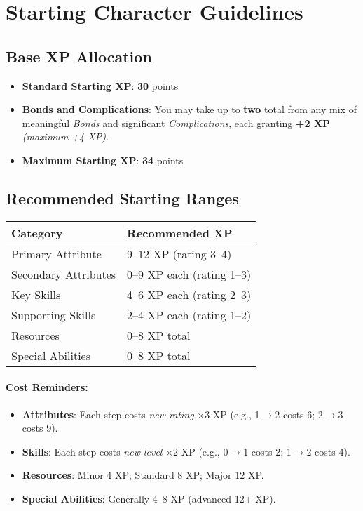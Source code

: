 \section{Starting Character Guidelines}
\label{ch:xp-paths:starting}

\subsection*{Base XP Allocation}
\begin{itemize}
\item \textbf{Standard Starting XP}: \textbf{30} points
\item \textbf{Bonds and Complications}: You may take up to \textbf{two} total from any mix of meaningful \emph{Bonds} and significant \emph{Complications}, each granting \textbf{+2 XP} \emph{(maximum +4 XP)}.
\item \textbf{Maximum Starting XP}: \textbf{34} points
\end{itemize}

\subsection*{Recommended Starting Ranges}
\begin{center}
\small
\begin{tabular}{ll}
\toprule
\textbf{Category} & \textbf{Recommended XP} \\
\midrule
Primary Attribute & 9--12 XP (rating 3--4) \\
Secondary Attributes & 0--9 XP each (rating 1--3) \\
Key Skills & 4--6 XP each (rating 2--3) \\
Supporting Skills & 2--4 XP each (rating 1--2) \\
Resources & 0--8 XP total \\
Special Abilities & 0--8 XP total \\
\bottomrule
\end{tabular}
\end{center}

\paragraph{Cost Reminders:}
\begin{itemize}
\item \textbf{Attributes}: Each step costs \emph{new rating} $\times 3$ XP (e.g., 1$\to$2 costs 6; 2$\to$3 costs 9).
\item \textbf{Skills}: Each step costs \emph{new level} $\times 2$ XP (e.g., 0$\to$1 costs 2; 1$\to$2 costs 4).
\item \textbf{Resources}: Minor 4 XP; Standard 8 XP; Major 12 XP.
\item \textbf{Special Abilities}: Generally 4--8 XP (advanced 12+ XP).
\end{itemize}

